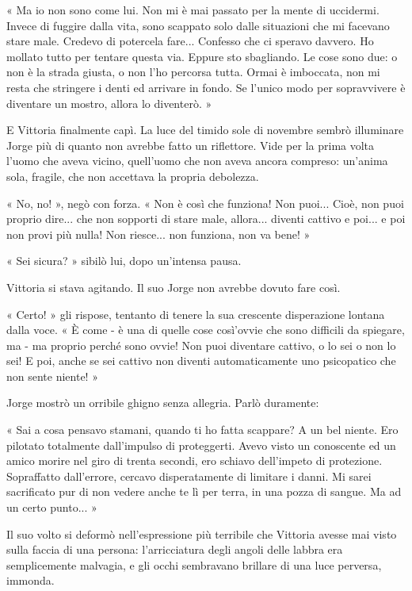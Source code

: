« Ma io non sono come lui. Non mi è mai passato per la mente di uccidermi. Invece di fuggire dalla vita, sono scappato solo dalle situazioni che mi facevano stare male. Credevo di potercela fare... Confesso che ci speravo davvero. Ho mollato tutto per tentare questa via. Eppure sto sbagliando. Le cose sono due: o non è la strada giusta, o non l'ho percorsa tutta. Ormai è imboccata, non mi resta che stringere i denti ed arrivare in fondo. Se l'unico modo per sopravvivere è diventare un mostro, allora lo diventerò. »

E Vittoria finalmente capì. La luce del timido sole di novembre sembrò illuminare Jorge più di quanto non avrebbe fatto un riflettore. Vide per la prima volta l'uomo che aveva vicino, quell'uomo che non aveva ancora compreso: un'anima sola, fragile, che non accettava la propria debolezza.

« No, no! », negò con forza. « Non è così che funziona! Non puoi... Cioè, non puoi proprio dire... che non sopporti di stare male, allora... diventi cattivo e poi... e poi non provi più nulla! Non riesce... non funziona, non va bene! »

« Sei sicura? » sibilò lui, dopo un'intensa pausa.

Vittoria si stava agitando. Il suo Jorge non avrebbe dovuto fare così.

« Certo! » gli rispose, tentanto di tenere la sua crescente disperazione lontana dalla voce. « È come - è una di quelle cose così'ovvie che sono difficili da spiegare, ma - ma proprio perché sono ovvie! Non puoi diventare cattivo, o lo sei o non lo sei! E poi, anche se sei cattivo non diventi automaticamente uno psicopatico che non sente niente! »

Jorge mostrò un orribile ghigno senza allegria. Parlò duramente:

« Sai a cosa pensavo stamani, quando ti ho fatta scappare? A un bel niente. Ero pilotato totalmente dall'impulso di proteggerti. Avevo visto un conoscente ed un amico morire nel giro di trenta secondi, ero schiavo dell'impeto di protezione. Sopraffatto dall'errore, cercavo disperatamente di limitare i danni. Mi sarei sacrificato pur di non vedere anche te lì per terra, in una pozza di sangue. Ma ad un certo punto... »

Il suo volto si deformò nell'espressione più terribile che Vittoria avesse mai visto sulla faccia di una persona: l'arricciatura degli angoli delle labbra era semplicemente malvagia, e gli occhi sembravano brillare di una luce perversa, immonda.

